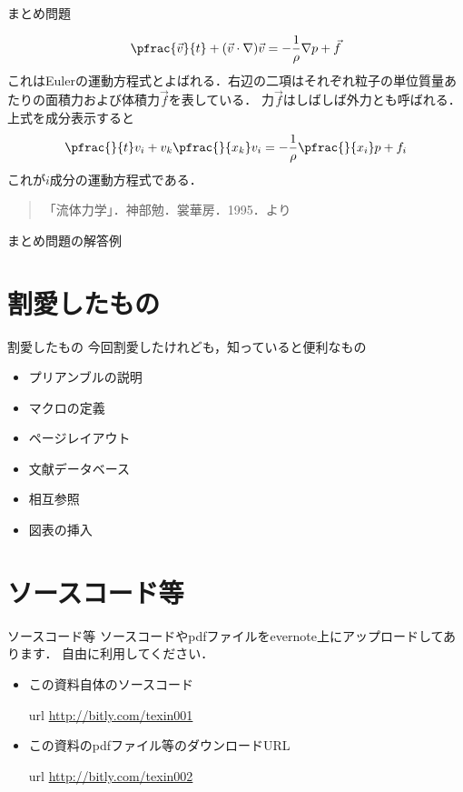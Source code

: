 \documentclass[slide,dvipdfmx]{beamer}
\begin{document}
\begin{frame}{まとめ問題}

\begin{shadebox}
\begin{align*}
\pfrac{\vec{v}}{t} + (\vec{v}\cdot\nabla)\vec{v} = - \frac{1}{\rho} \nabla p + \vec{f}
\end{align*}
これはEulerの運動方程式とよばれる．右辺の二項はそれぞれ粒子の単位質量あたりの面積力および体積力$\vec{f}$を表している．
力$\vec{f}$はしばしば外力とも呼ばれる．
上式を成分表示すると
\begin{align*}
\pfrac{}{t} v_i +v_k \pfrac{}{x_k} v_i = - \frac{1}{\rho} \pfrac{}{x_i} p + f_i
\end{align*}
これが$i$成分の運動方程式である．
\end{shadebox}
\begin{quotation}
「流体力学」．神部勉．裳華房．1995．より
\end{quotation}
\end{frame}


\begin{frame}[allowdisplaybreaks=4,allowframebreaks=1]{まとめ問題の解答例}

\end{frame}


\section{割愛したもの}
\begin{frame}{割愛したもの}
今回割愛したけれども，知っていると便利なもの
\begin{itemize}
\item プリアンブルの説明
\item マクロの定義
\item ページレイアウト
\item 文献データベース
\item 相互参照
\item 図表の挿入
\end{itemize}
\end{frame}

\section{ソースコード等}
\begin{frame}{ソースコード等}
ソースコードやpdfファイルをevernote上にアップロードしてあります．
自由に利用してください．
\begin{itemize}
\item この資料自体のソースコード
\item[url] \url{http://bitly.com/texin001}
\item この資料のpdfファイル等のダウンロードURL
\item[url] \url{http://bitly.com/texin002}
\end{itemize}
\end{frame}
\end{document}
